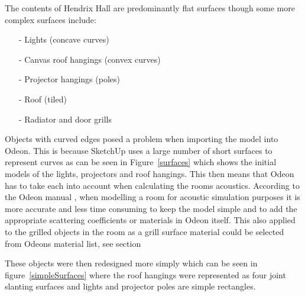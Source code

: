 \documentclass[../../main.tex]{subfiles}
\begin{document}
			The contents of Hendrix Hall are predominantly flat surfaces though some more complex surfaces include:

			\begin{itemize}
				\item[-] Lights (concave curves) 
				\item[-] Canvas roof hangings (convex curves) 
				\item[-] Projector hangings (poles)
				\item[-] Roof (tiled) 
				\item[-] Radiator and door grills \\
			\end{itemize}

			Objects with curved edges posed a problem when importing the model into Odeon. This is because SketchUp uses a large number of short surfaces to represent curves as can be seen in Figure~\ref{surfaces} which shows the initial models of the lights, projectors and roof hangings. This then means that Odeon has to take each into account when calculating the rooms acoustics. According to the Odeon manual \cite{odeonManual}, when modelling a room for acoustic simulation purposes it is more accurate and less time consuming to keep the model simple and to add the appropriate scattering coefficients or materials in Odeon itself. This also applied to the grilled objects in the room as a grill surface material could be selected from Odeons material list, see section 


			These objects were then redesigned more simply which can be seen in figure~\ref{simpleSurfaces} where the roof hangings were represented as four joint slanting surfaces and lights and projector poles are simple rectangles.

\end{document}
